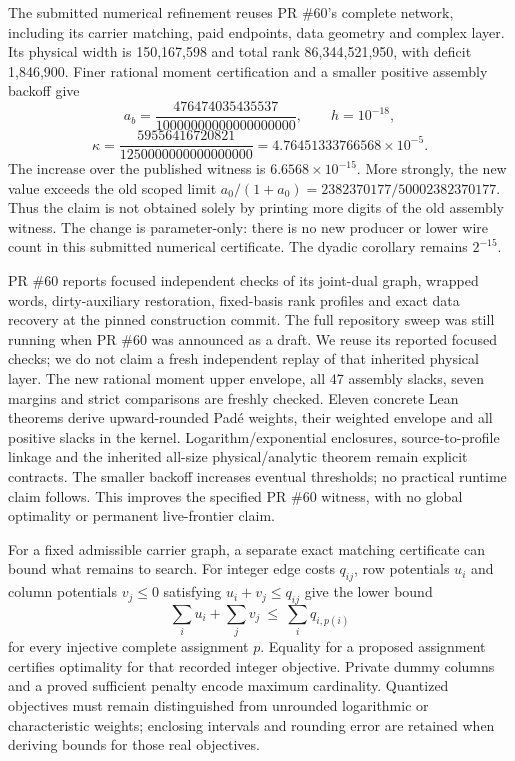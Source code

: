 \documentclass[11pt]{article}
\begin{document}
The submitted numerical refinement reuses PR \#60's complete network,
including its carrier matching, paid endpoints, data geometry and complex layer.
Its physical width is 150,167,598 and total rank 86,344,521,950, with deficit
1,846,900. Finer rational moment certification and a smaller positive
assembly backoff give
\[
 a_b=\frac{476474035435537}{10000000000000000000},\qquad h=10^{-18},
\]
\[
 \kappa=\frac{59556416720821}{1250000000000000000}
       =4.76451333766568\times10^{-5}.
\]
The increase over the published witness is $6.6568\times10^{-15}$.
More strongly, the new value exceeds the old scoped limit
$a_0/(1+a_0)=2382370177/50002382370177$. Thus the claim is not obtained
solely by printing more digits of the old assembly witness. The change is
parameter-only: there is no new producer or lower wire count in this
submitted numerical certificate. The dyadic corollary remains $2^{-15}$.

PR \#60 reports focused independent checks of its joint-dual graph, wrapped words,
dirty-auxiliary restoration, fixed-basis rank profiles and exact data recovery
at the pinned construction commit. The full repository sweep was still running
when PR \#60 was announced as a draft. We reuse its reported focused checks;
we do not claim a fresh independent replay of that inherited physical layer.
The new rational moment upper envelope, all 47 assembly slacks, seven margins
and strict comparisons are freshly checked. Eleven concrete Lean theorems
derive upward-rounded Pad\'e weights, their weighted envelope and all positive
slacks in the kernel. Logarithm/exponential enclosures, source-to-profile linkage
and the inherited all-size physical/analytic theorem remain explicit contracts.
The smaller backoff increases eventual thresholds; no practical runtime claim
follows. This improves the specified PR \#60 witness, with no global optimality
or permanent live-frontier claim.

For a fixed admissible carrier graph, a separate exact matching certificate
can bound what remains to search. For integer edge costs $q_{ij}$, row
potentials $u_i$ and column potentials $v_j\le0$ satisfying
$u_i+v_j\le q_{ij}$ give the lower bound
\[
 \sum_i u_i+\sum_j v_j\ \le\ \sum_i q_{i,p(i)}
\]
for every injective complete assignment $p$. Equality for a proposed
assignment certifies optimality for that recorded integer objective.
Private dummy columns and a proved sufficient penalty encode maximum
cardinality. Quantized objectives must remain distinguished from
unrounded logarithmic or characteristic weights; enclosing intervals and
rounding error are retained when deriving bounds for those real objectives.
\end{document}
